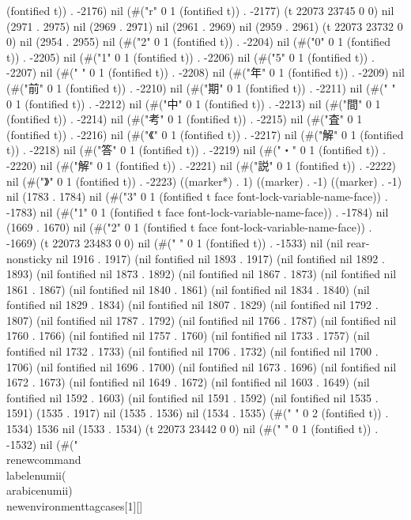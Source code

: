 (fontified t)) . -2176) nil (#("r" 0 1 (fontified t)) . -2177) (t 22073 23745 0 0) nil (2971 . 2975) nil (2969 . 2971) nil (2961 . 2969) nil (2959 . 2961) (t 22073 23732 0 0) nil (2954 . 2955) nil (#("2" 0 1 (fontified t)) . -2204) nil (#("0" 0 1 (fontified t)) . -2205) nil (#("1" 0 1 (fontified t)) . -2206) nil (#("5" 0 1 (fontified t)) . -2207) nil (#(" " 0 1 (fontified t)) . -2208) nil (#("年" 0 1 (fontified t)) . -2209) nil (#("前" 0 1 (fontified t)) . -2210) nil (#("期" 0 1 (fontified t)) . -2211) nil (#(" " 0 1 (fontified t)) . -2212) nil (#("中" 0 1 (fontified t)) . -2213) nil (#("間" 0 1 (fontified t)) . -2214) nil (#("考" 0 1 (fontified t)) . -2215) nil (#("査" 0 1 (fontified t)) . -2216) nil (#("《" 0 1 (fontified t)) . -2217) nil (#("解" 0 1 (fontified t)) . -2218) nil (#("答" 0 1 (fontified t)) . -2219) nil (#("・" 0 1 (fontified t)) . -2220) nil (#("解" 0 1 (fontified t)) . -2221) nil (#("説" 0 1 (fontified t)) . -2222) nil (#("》" 0 1 (fontified t)) . -2223) ((marker*) . 1) ((marker) . -1) ((marker) . -1) nil (1783 . 1784) nil (#("3" 0 1 (fontified t face font-lock-variable-name-face)) . -1783) nil (#("1" 0 1 (fontified t face font-lock-variable-name-face)) . -1784) nil (1669 . 1670) nil (#("2" 0 1 (fontified t face font-lock-variable-name-face)) . -1669) (t 22073 23483 0 0) nil (#("
" 0 1 (fontified t)) . -1533) nil (nil rear-nonsticky nil 1916 . 1917) (nil fontified nil 1893 . 1917) (nil fontified nil 1892 . 1893) (nil fontified nil 1873 . 1892) (nil fontified nil 1867 . 1873) (nil fontified nil 1861 . 1867) (nil fontified nil 1840 . 1861) (nil fontified nil 1834 . 1840) (nil fontified nil 1829 . 1834) (nil fontified nil 1807 . 1829) (nil fontified nil 1792 . 1807) (nil fontified nil 1787 . 1792) (nil fontified nil 1766 . 1787) (nil fontified nil 1760 . 1766) (nil fontified nil 1757 . 1760) (nil fontified nil 1733 . 1757) (nil fontified nil 1732 . 1733) (nil fontified nil 1706 . 1732) (nil fontified nil 1700 . 1706) (nil fontified nil 1696 . 1700) (nil fontified nil 1673 . 1696) (nil fontified nil 1672 . 1673) (nil fontified nil 1649 . 1672) (nil fontified nil 1603 . 1649) (nil fontified nil 1592 . 1603) (nil fontified nil 1591 . 1592) (nil fontified nil 1535 . 1591) (1535 . 1917) nil (1535 . 1536) nil (1534 . 1535) (#("  " 0 2 (fontified t)) . 1534) 1536 nil (1533 . 1534) (t 22073 23442 0 0) nil (#("
" 0 1 (fontified t)) . -1532) nil (#("
\\renewcommand{\\labelenumii}{(\\arabic{enumii})}
\\newenvironment{tagcases}[1][]
